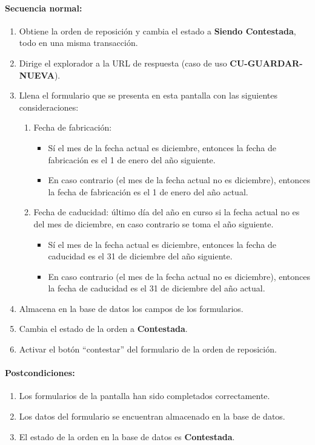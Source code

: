 \paragraph{Secuencia normal:}
\begin{enumerate}
  \item Obtiene la orden de reposición y cambia el estado a \textbf{Siendo Contestada}, todo en una misma transacción.
  \item Dirige el explorador a la URL de respuesta (caso de uso \textbf{CU-GUARDAR-NUEVA}).
  \item Llena el formulario que se presenta en esta pantalla con las siguientes consideraciones:
  \begin{enumerate}
    \item Fecha de fabricación:
    \begin{itemize}
      \item Sí el mes de la fecha actual es diciembre, entonces la fecha de fabricación es el 1 de enero del año siguiente.
      \item En caso contrario (el mes de la fecha actual no es diciembre), entonces la fecha de fabricación es el 1 de enero del año actual.
    \end{itemize}
    \item Fecha de caducidad: último día del año en curso si la fecha actual no es del mes de diciembre, en caso contrario se toma el año siguiente.
    \begin{itemize}
      \item Sí el mes de la fecha actual es diciembre, entonces la fecha de caducidad es el 31 de diciembre del año siguiente.
      \item En caso contrario (el mes de la fecha actual no es diciembre), entonces la fecha de caducidad es el 31 de diciembre del año actual.
    \end{itemize}
  \end{enumerate}
  \item Almacena en la base de datos los campos de los formularios.
  \item Cambia el estado de la orden a \textbf{Contestada}.
  \item Activar el botón ``contestar'' del formulario de la orden de reposición.
\end{enumerate}
\paragraph{Postcondiciones:}
\begin{enumerate}
  \item Los formularios de la pantalla han sido completados correctamente.
  \item Los datos del formulario se encuentran almacenado en la base de datos.
  \item El estado de la orden en la base de datos es \textbf{Contestada}.
\end{enumerate}
